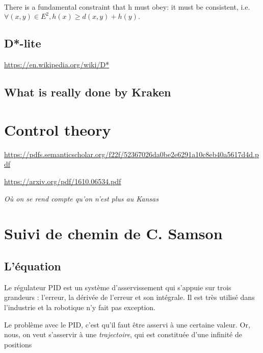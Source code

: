 \documentclass[11pt]{article}
\begin{document}
	There is a fundamental constraint that h must obey: it must be consistent, i.e. $\forall (x,y) \in E^2, h(x) \geq d(x,y) + h(y).$
    

    \subsection{D*-lite}\label{sec:d*-lite}
    
    \cite{koenig2002d}
    
    
    \href{https://en.wikipedia.org/wiki/D*}{https://en.wikipedia.org/wiki/D*}
    
    \subsection{What is really done by Kraken}
    

    \section{Control theory}\label{sec:controlTheory}

    \href{https://pdfs.semanticscholar.org/f22f/52367026da0be2e6291a10c8eb40a5617d4d.pdf}{https://pdfs.semanticscholar.org/f22f/52367026da0be2e6291a10c8eb40a5617d4d.pdf}

    \href{https://arxiv.org/pdf/1610.06534.pdf}{https://arxiv.org/pdf/1610.06534.pdf}





    \hfill \textit{Où on se rend compte qu'on n'est plus au Kansas}

    \section{Suivi de chemin de C. Samson}\label{sec:suiviDeCheminDeC.Samson}

    \subsection{L'équation}

    Le régulateur PID est un système d'asservissement qui s'appuie sur trois grandeurs : l'erreur, la dérivée de l'erreur et son intégrale. Il est très utilisé dans l'industrie et la robotique n'y fait pas exception.

    Le problème avec le PID, c'est qu'il faut être asservi à une certaine valeur. Or, nous, on veut s'asservir à une \emph{trajectoire}, qui est constituée d'une infinité de positions %
\end{document}

